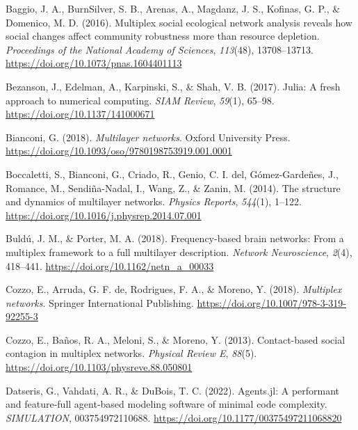 \documentclass[
]{article}
\newlength{\cslhangindent}
\newlength{\cslentryspacingunit} %
\newenvironment{CSLReferences}[2] %
 {%
  \setlength{\parindent}{0pt}
  \ifodd #1
  \let\oldpar\par
  \def\par{\hangindent=\cslhangindent\oldpar}
  \fi
  \setlength{\parskip}{#2\cslentryspacingunit}
 }%
 {}
\begin{document}
\begin{CSLReferences}{1}{0}
\leavevmode{}%
Baggio, J. A., BurnSilver, S. B., Arenas, A., Magdanz, J. S., Kofinas,
G. P., \& Domenico, M. D. (2016). Multiplex social ecological network
analysis reveals how social changes affect community robustness more
than resource depletion. \emph{Proceedings of the National Academy of
Sciences}, \emph{113}(48), 13708--13713.
\url{https://doi.org/10.1073/pnas.1604401113}

\leavevmode{}%
Bezanson, J., Edelman, A., Karpinski, S., \& Shah, V. B. (2017). Julia:
A fresh approach to numerical computing. \emph{{SIAM} Review},
\emph{59}(1), 65--98. \url{https://doi.org/10.1137/141000671}

\leavevmode{}%
Bianconi, G. (2018). \emph{Multilayer networks}. Oxford University
Press. \url{https://doi.org/10.1093/oso/9780198753919.001.0001}

\leavevmode{}%
Boccaletti, S., Bianconi, G., Criado, R., Genio, C. I. del,
Gómez-Gardeñes, J., Romance, M., Sendiña-Nadal, I., Wang, Z., \& Zanin,
M. (2014). The structure and dynamics of multilayer networks.
\emph{Physics Reports}, \emph{544}(1), 1--122.
\url{https://doi.org/10.1016/j.physrep.2014.07.001}

\leavevmode{}%
Buldú, J. M., \& Porter, M. A. (2018). Frequency-based brain networks:
From a multiplex framework to a full multilayer description.
\emph{Network Neuroscience}, \emph{2}(4), 418--441.
\url{https://doi.org/10.1162/netn_a_00033}

\leavevmode{}%
Cozzo, E., Arruda, G. F. de, Rodrigues, F. A., \& Moreno, Y. (2018).
\emph{Multiplex networks}. Springer International Publishing.
\url{https://doi.org/10.1007/978-3-319-92255-3}

\leavevmode{}%
Cozzo, E., Baños, R. A., Meloni, S., \& Moreno, Y. (2013). Contact-based
social contagion in multiplex networks. \emph{Physical Review E},
\emph{88}(5). \url{https://doi.org/10.1103/physreve.88.050801}

\leavevmode{}%
Datseris, G., Vahdati, A. R., \& DuBois, T. C. (2022). Agents.jl: A
performant and feature-full agent-based modeling software of minimal
code complexity. \emph{{SIMULATION}}, 003754972110688.
\url{https://doi.org/10.1177/00375497211068820}


\end{CSLReferences}
\end{document}
